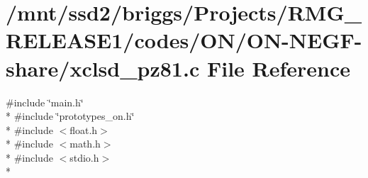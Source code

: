 \hypertarget{_o_n_2_o_n-_n_e_g_f-share_2xclsd__pz81_8c}{\section{/mnt/ssd2/briggs/\-Projects/\-R\-M\-G\-\_\-\-R\-E\-L\-E\-A\-S\-E1/codes/\-O\-N/\-O\-N-\/\-N\-E\-G\-F-\/share/xclsd\-\_\-pz81.c File Reference}
\label{_o_n_2_o_n-_n_e_g_f-share_2xclsd__pz81_8c}
}
{\ttfamily \#include \char`\"{}main.\-h\char`\"{}}\\*
{\ttfamily \#include \char`\"{}prototypes\-\_\-on.\-h\char`\"{}}\\*
{\ttfamily \#include $<$float.\-h$>$}\\*
{\ttfamily \#include $<$math.\-h$>$}\\*
{\ttfamily \#include $<$stdio.\-h$>$}\\*
